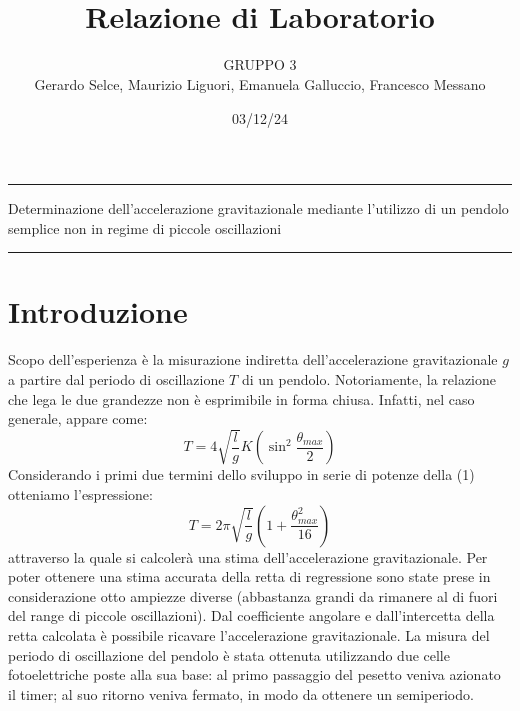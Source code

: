 \documentclass[11pt]{article}
\begin{document}
\setlength{\parindent}{0pt}
\title{\vspace{-4em}{\large Laboratorio di Meccanica e Termodinamica} \\
    Relazione di Laboratorio}
\author{GRUPPO 3 \\
        Gerardo Selce, Maurizio Liguori, Emanuela Galluccio, Francesco Messano}
\date{03/12/24}
\maketitle

\vspace{-2em}\par\noindent\rule{\textwidth}{0.4pt}
\begin{center}
    {\Large\sc Determinazione dell’accelerazione gravitazionale mediante
l’utilizzo di un pendolo semplice non in regime di piccole
oscillazioni} 
\end{center}
\par\noindent\rule{\textwidth}{0.4pt}

\section{Introduzione}

Scopo dell'esperienza è la misurazione indiretta dell'accelerazione gravitazionale $g$ a partire dal periodo di oscillazione $T$ di un pendolo. Notoriamente, la relazione che lega le due grandezze non è esprimibile in forma chiusa. Infatti, nel caso generale, appare come:
\begin{equation}
    T=4\sqrt{\frac{l}{g}}K\left(\sin^2\frac{\theta_{max}}{2}\right)
\end{equation}
Considerando i primi due termini dello sviluppo in serie di potenze della (1) otteniamo l'espressione:
\begin{equation}
    T=2\pi\sqrt{\frac{l}{g}}\left(1+\frac{\theta_{max}^2}{16}\right)
\end{equation}
attraverso la quale si calcolerà una stima dell'accelerazione gravitazionale. Per poter ottenere una stima accurata della retta di regressione sono state prese in considerazione otto ampiezze diverse (abbastanza grandi da rimanere al di fuori del range di piccole oscillazioni). Dal coefficiente angolare e dall'intercetta della retta calcolata è possibile ricavare l'accelerazione gravitazionale. La misura del periodo di oscillazione del pendolo è stata ottenuta utilizzando due celle fotoelettriche poste alla sua base: al primo passaggio del pesetto veniva azionato il timer; al suo ritorno veniva fermato, in modo da ottenere un semiperiodo.
\end{document}
